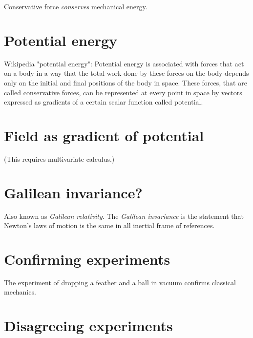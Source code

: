 
Conservative force \emph{conserves} mechanical energy.

\section{Potential energy}


Wikipedia "potential energy":
Potential energy is associated with forces that act on a body in a way that the total work done by these forces on the body depends only on the initial and final positions of the body in space. These forces, that are called conservative forces, can be represented at every point in space by vectors expressed as gradients of a certain scalar function called potential.

\section{Field as gradient of potential}

(This requires multivariate calculus.)

\section{Galilean invariance?}


Also known as \emph{Galilean relativity}.
The \emph{Galilean invariance} is the statement
that Newton's laws of motion is the same in all inertial frame of references.


\section{Confirming experiments}

The experiment of dropping a feather and a ball in vacuum confirms classical mechanics.

\section{Disagreeing experiments}

